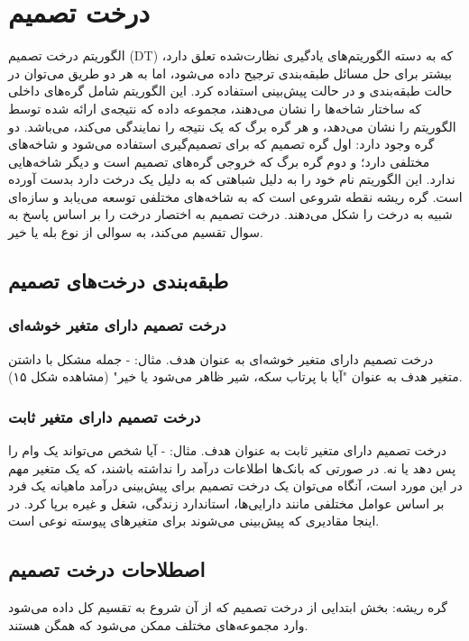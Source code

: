 \documentclass{CSICC2020}
\begin{document}
\section{درخت تصمیم}
الگوریتم درخت تصمیم (DT) که به دسته الگوریتم‌های یادگیری نظارت‌شده تعلق دارد، بیشتر برای حل مسائل طبقه‌بندی ترجیح داده می‌شود، اما به هر دو طریق می‌توان در حالت طبقه‌بندی و در حالت پیش‌بینی استفاده کرد. این الگوریتم شامل گره‌های داخلی که ساختار شاخه‌ها را نشان می‌دهند، مجموعه داده که نتیجه‌ی ارائه شده توسط الگوریتم را نشان می‌دهد، و هر گره برگ که یک نتیجه را نمایندگی می‌کند، می‌باشد. دو گره وجود دارد: اول گره تصمیم که برای تصمیم‌گیری استفاده می‌شود و شاخه‌های مختلفی دارد؛ و دوم گره برگ که خروجی گره‌های تصمیم است و دیگر شاخه‌هایی ندارد. این الگوریتم نام خود را به دلیل شباهتی که به دلیل یک درخت دارد بدست آورده است. گره ریشه نقطه شروعی است که به شاخه‌های مختلفی توسعه می‌یابد و سازه‌ای شبیه به درخت را شکل می‌دهند. درخت تصمیم به اختصار درخت را بر اساس پاسخ به سوال تقسیم می‌کند، به سوالی از نوع بله یا خیر. 

\subsection{طبقه‌بندی درخت‌های تصمیم }

\subsubsection{درخت تصمیم دارای متغیر خوشه‌ای}
درخت تصمیم دارای متغیر خوشه‌ای به عنوان هدف. 
مثال: - جمله مشکل با داشتن متغیر هدف به عنوان "آیا با پرتاب سکه، شیر ظاهر می‌شود یا خیر" (مشاهده شکل ۱۵). 
\subsubsection{درخت تصمیم دارای متغیر ثابت }
درخت تصمیم دارای متغیر ثابت به عنوان هدف. 
مثال: - آیا شخص می‌تواند یک وام را پس دهد یا نه. در صورتی که بانک‌ها اطلاعات درآمد را نداشته باشند، که یک متغیر مهم در این مورد است، آنگاه می‌توان یک درخت تصمیم برای پیش‌بینی درآمد ماهیانه یک فرد بر اساس عوامل مختلفی مانند دارایی‌ها، استاندارد زندگی، شغل و غیره برپا کرد. در اینجا مقادیری که پیش‌بینی می‌شوند برای متغیرهای پیوسته نوعی است. 
\subsection{اصطلاحات درخت تصمیم}


 گره ریشه: بخش ابتدایی از درخت تصمیم که از آن شروع به تقسیم کل داده می‌شود وارد مجموعه‌های مختلف ممکن می‌شود که همگن هستند. 
\end{document}
